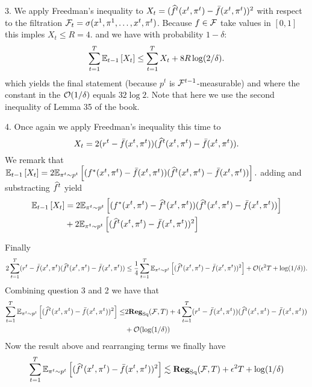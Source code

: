 \begin{solution}[]
3. We apply Freedman’s inequality to $X_t = (\wh f^t(x^t,\pi^t)-\bar f(x^t,\pi^t))^2$ with respect to the filtration $\F_t = \sigma(x^1,\pi^1,\ldots,x^t,\pi^t)$.
Because $f \in \F$ take values in $[0,1]$ this imples $X_t \leq R= 4.$ and we have with probability $1-\delta$: 
\[\sum_{t=1}^T \EEs{X_t}{t-1}  \leq \sum_{t=1}^T X_t + 8R\log(2/ \delta). \]
which yields the final statement (because $p^t$ is $\F^{t-1}$-measurable) and where the constant in the $\OO (1/\delta)$ equals $32 \log 2$.
Note that here we use the second inequality of Lemma 35 of the book.

4. Once again we apply Freedman’s inequality this time to 
\[X_t = 2(r^t-\bar f(x^t,\pi^t))(\wh f^t(x^t,\pi^t)-\bar f(x^t,\pi^t)).\]
We remark that $\EEs{X_t}{t-1} = 2\EEs{(f^*(x^t,\pi^t)-\bar f(x^t,\pi^t))(\wh f^t(x^t,\pi^t)-\bar f(x^t,\pi^t))}{\pi^t \sim p^t}.$
adding and substracting $\wh f^t$ yield
\begin{align*}\EEs{X_t}{t-1} &=2\EEs{(f^*(x^t,\pi^t)-\wh f^t(x^t,\pi^t))(\wh f^t(x^t,\pi^t)-\bar f(x^t,\pi^t))}{\pi^t \sim p^t}\\ 
&+2\EEs{(\wh f^t(x^t,\pi^t)-\bar f(x^t,\pi^t))^2}{\pi^t \sim p^t}
\end{align*}


Finally \[ 2\sum_{t=1}^T (r^t-\bar f(x^t,\pi^t)(\wh f^t(x^t,\pi^t)-\bar f(x^t,\pi^t))\leq \frac{1}{4}\sum_{t=1}^T \EEs{(\wh f^t(x^t,\pi^t)-\bar f(x^t,\pi^t))^2}{\pi^t \sim p^t}  + \OO(\epsilon^2 T + \log(1/\delta)).\]
Combining question 3 and 2 we have that 
\begin{align*}
\sum_{t=1}^T \EEs{(\wh f^t (x^t,\pi^t)-\bar f(x^t,\pi^t))^2}{\pi^t \sim p^t}  \leq &2 \Reg_{\text{Sq}}(\F,T)+4\sum_{t=1}^T(r^t-\bar f(x^t,\pi^t))(\wh f^t(x^t,\pi^t)-\bar f(x^t,\pi^t))\\
&+\OO(\log(1/\delta))
\end{align*}
Now the result above and rearranging terms we finally have 
\[\sum_{t=1}^T \EEs{(\wh f^t (x^t,\pi^t)-\bar f(x^t,\pi^t))^2}{\pi^t \sim p^t} \lesssim \Reg_{\text{Sq}}(\F,T)+\epsilon^2T+\log(1/\delta)\]

\end{solution}
